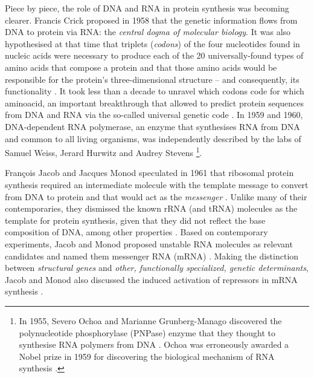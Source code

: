 Piece by piece, the role of DNA and RNA in protein synthesis was becoming clearer. Francis Crick proposed in 1958 that the genetic information flows from DNA to protein via RNA: the \emph{central dogma of molecular biology}\cite{crick:1958ws,crick:1970aa}. It was also hypothesised at that time that triplets (\emph{codons}) of the four nucleotides found in nucleic acids were necessary to produce each of the 20 universally-found types of amino acids that compose a protein \cite{crick:1958ws,crick:1961ui} and that those amino acids would be responsible for the protein's three-dimensional structure -- and consequently, its functionality \cite{crick:1958ws}. It took less than a decade to unravel which codons code for which aminoacid, an important breakthrough that allowed to predict protein sequences from DNA and RNA via the so-called universal genetic code \cite{khorana:1966vr,crick:1968wg}. %
In 1959 and 1960, DNA-dependent RNA polymerase, an enzyme that synthesises RNA from DNA and common to all living organisms, was independently described by the labs of Samuel Weiss, Jerard Hurwitz and Audrey Stevens \cite{hurwitz:1960uf,weiss:1959vp,stevens:1960ue} \footnote{In 1955, Severo Ochoa and Marianne Grunberg-Manago discovered the polynucleotide phosphorylase (PNPase) enzyme that they thought to synthesise RNA polymers from DNA \cite{grunberg-manago:1956wb}. Ochoa was erroneously awarded a Nobel prize in 1959 for discovering the biological mechanism of RNA synthesis \cite{}.}.


François Jacob and Jacques Monod speculated in 1961 that ribosomal protein synthesis required an intermediate molecule with the template message to convert from DNA to protein and that would act as the \emph{messenger} \cite{jacob:1961uh,brenner:1961ve}. Unlike many of their contemporaries, they dismissed the known rRNA (and tRNA) molecules as the template for protein synthesis, given that they did not reflect the base composition of DNA, among other properties \cite{jacob:1961uh}. Based on contemporary experiments, Jacob and Monod proposed unstable RNA molecules as relevant candidates and named them messenger RNA (mRNA) \cite{jacob:1961uh,brenner:1961ve}. Making the distinction between \emph{structural genes} and \emph{other, functionally specialized, genetic determinants}, Jacob and Monod also discussed the induced activation of repressors in mRNA synthesis \cite{jacob:1961uh}.

